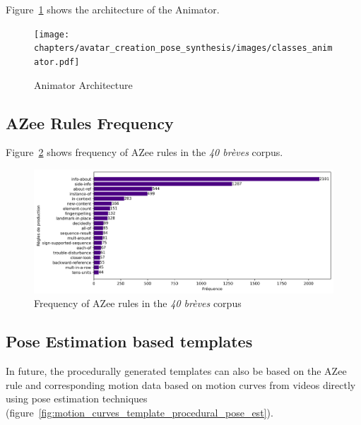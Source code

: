 \documentclass[../main.tex]{subfiles}
\begin{document}
Figure~\ref{fig:animator_architecture} shows the architecture of the Animator.

\begin{figure}
    \centering
    \texttt{[image: chapters/avatar\_creation\_pose\_synthesis/images/classes\_animator.pdf]}
    \caption{Animator Architecture}
    \label{fig:animator_architecture}
\end{figure}


\subsection{AZee Rules Frequency}
\label{annex:intermediate_blocks_pose_correction:azee_rules_frequency}

Figure~\ref{fig:azee_rule_frequency_ch1} shows frequency of AZee rules in the \emph{40 brèves} corpus.

\begin{figure}[h]
    \centering
    \includegraphics[width=5in]{chapters/intermediate_blocks_pose_correction/images/azee_rule_frequency.png}
    \caption{Frequency of AZee rules in the \emph{40 brèves} corpus}
    \label{fig:azee_rule_frequency_ch1}
\end{figure}

\subsection{Pose Estimation based templates}
\label{annex:intermediate_blocks_pose_correction:pose_est_templates}

In future, the procedurally generated templates can also be based on the AZee rule and corresponding motion data based on motion curves from videos directly using pose estimation techniques (figure~\ref{fig:motion_curves_template_procedural_pose_est}).
\end{document}
